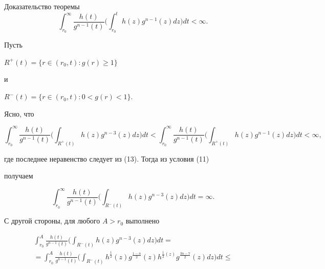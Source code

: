 \begin{pf*}{Доказательство теоремы}
\begin{equation}
\int_{r_0}^{\infty}\frac{h(t)}{g^{n-1}(t)}\biggl(\int_{r_0}^{t}


h(z)g^{n-1}(z)dz\biggr)dt < \infty .


\end{equation}





Пусть


$R^{+}(t)=\{r\in(r_0,t):g(r)\ge 1\}$


и


$R^{-}(t)=\{r\in(r_0,t):0 < g(r) < 1 \}$.


Ясно, что


$$


\int_{r_0}^{\infty}\frac{h(t)}{g^{n-1}(t)}\biggl(\int_{R^{+}(t)}


h(z)g^{n-3}(z)dz\biggr)dt <


\int_{r_0}^{\infty}\frac{h(t)}{g^{n-1}(t)}\biggl(\int_{R^{+}(t)}


h(z)g^{n-1}(z)dz\biggr)dt < \infty,


$$


где последнее неравенство следует из (13). Тогда из условия (11)


получаем


%


\begin{equation}


\int_{r_0}^{\infty}\frac{h(t)}{g^{n-1}(t)}\biggl(\int_{R^{-}(t)}


h(z)g^{n-3}(z)dz\biggr)dt = \infty.


\end{equation}





С другой стороны, для любого $ A > r_0$ выполнено


\begin{gather*}


\int_{r_0}^{A}\frac{h(t)}{g^{n-1}(t)}\biggl(\int_{R^{-}(t)}


h(z)g^{n-3}(z)dz\biggr)dt =\\


%


= \int_{r_0}^{A}\frac{h(t)}{g^{n-1}(t)}


\biggl(\int_{R^{-}(t)}h^{\frac{1}{2}}(z)g^{\frac{1-n}{2}}(z)


h^{\frac{1}{2}(z)}g^{\frac{3n-7}{2}}(z)dz\biggr)dt \le \\


%



\end{gather*}
\end{pf*}
